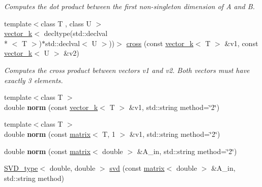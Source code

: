 \begin{DoxyCompactItemize}
\begin{DoxyCompactList}\small\item\em Computes the dot product between the first non-\/singleton dimension of A and B. \end{DoxyCompactList}\item 
\hypertarget{namespacekeycpp_aa590a6946f71f4c1b2e575bdb791f00f}{{\footnotesize template$<$class T , class U $>$ }\\\hyperlink{classkeycpp_1_1vector__k}{vector\-\_\-k}$<$ decltype(std\-::declval\\*
$<$ T $>$)$\ast$std\-::declval$<$ U $>$))$>$ \hyperlink{namespacekeycpp_aa590a6946f71f4c1b2e575bdb791f00f}{cross} (const \hyperlink{classkeycpp_1_1vector__k}{vector\-\_\-k}$<$ T $>$ \&v1, const \hyperlink{classkeycpp_1_1vector__k}{vector\-\_\-k}$<$ U $>$ \&v2)}\label{namespacekeycpp_aa590a6946f71f4c1b2e575bdb791f00f}

\begin{DoxyCompactList}\small\item\em Computes the cross product between vectors v1 and v2. Both vectors must have exactly 3 elements. \end{DoxyCompactList}\item 
\hypertarget{namespacekeycpp_a78ea0301dbb858bbfdf2646a857a1ec6}{{\footnotesize template$<$class T $>$ }\\double {\bfseries norm} (const \hyperlink{classkeycpp_1_1vector__k}{vector\-\_\-k}$<$ T $>$ \&v1, std\-::string method=\char`\"{}2\char`\"{})}\label{namespacekeycpp_a78ea0301dbb858bbfdf2646a857a1ec6}

\item 
\hypertarget{namespacekeycpp_ab1fd21d6dd27cb843b98af78a3ea6acc}{{\footnotesize template$<$class T $>$ }\\double {\bfseries norm} (const \hyperlink{classkeycpp_1_1matrix}{matrix}$<$ T, 1 $>$ \&v1, std\-::string method=\char`\"{}2\char`\"{})}\label{namespacekeycpp_ab1fd21d6dd27cb843b98af78a3ea6acc}

\item 
\hypertarget{namespacekeycpp_aeb34bdd249af3ce92341cdda62f95f65}{double {\bfseries norm} (const \hyperlink{classkeycpp_1_1matrix}{matrix}$<$ double $>$ \&A\-\_\-in, std\-::string method=\char`\"{}2\char`\"{})}\label{namespacekeycpp_aeb34bdd249af3ce92341cdda62f95f65}

\item 
\hypertarget{namespacekeycpp_a838fc93d66e1ab63d68d04781086d81a}{\hyperlink{classkeycpp_1_1_s_v_d__type}{S\-V\-D\-\_\-type}$<$ double, double $>$ \hyperlink{namespacekeycpp_a838fc93d66e1ab63d68d04781086d81a}{svd} (const \hyperlink{classkeycpp_1_1matrix}{matrix}$<$ double $>$ \&A\-\_\-in, std\-::string method)}\label{namespacekeycpp_a838fc93d66e1ab63d68d04781086d81a}


\end{DoxyCompactItemize}
